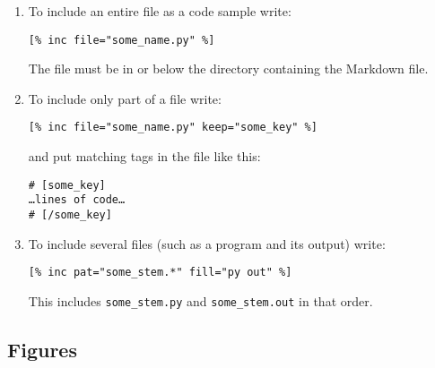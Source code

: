 \documentclass[krantzl]{krantz}
\begin{document}
\begin{enumerate}

\item 

To include an entire file as a code sample write:

\begin{lstlisting}[frame=single,frameround=tttt]
[% inc file="some_name.py" %]
\end{lstlisting}


The file must be in or below the directory containing the Markdown file.



\item 

To include only part of a file write:

\begin{lstlisting}[frame=single,frameround=tttt]
[% inc file="some_name.py" keep="some_key" %]
\end{lstlisting}


and put matching tags in the file like this:

\begin{lstlisting}[frame=single,frameround=tttt]
# [some_key]
…lines of code…
# [/some_key]
\end{lstlisting}



\item 

To include several files (such as a program and its output) write:

\begin{lstlisting}[frame=single,frameround=tttt]
[% inc pat="some_stem.*" fill="py out" %]
\end{lstlisting}


This includes \texttt{some\_stem.py} and \texttt{some\_stem.out} in that order.



\end{enumerate}

\subsection*{Figures}
\end{document}
